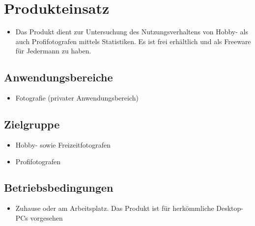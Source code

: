 \section{Produkteinsatz}
  \begin{itemize}
  \item Das Produkt dient zur Untersuchung des Nutzungsverhaltens von Hobby- als auch Profifotografen mittels Statistiken. Es ist frei erhältlich und als Freeware für Jedermann zu haben.
  \end{itemize}
\subsection{Anwendungsbereiche}
  \begin{itemize}
  \item Fotografie (privater Anwendungsbereich) 
  \end{itemize}

\subsection{Zielgruppe}
	\begin{itemize}
		\item Hobby- sowie Freizeitfotografen
		\item Profifotografen		
	\end{itemize}

\subsection{Betriebsbedingungen}
  \begin{itemize}
  		\item Zuhause oder am Arbeitsplatz. Das Produkt ist für herkömmliche Desktop-PCs vorgesehen
  \end{itemize}
